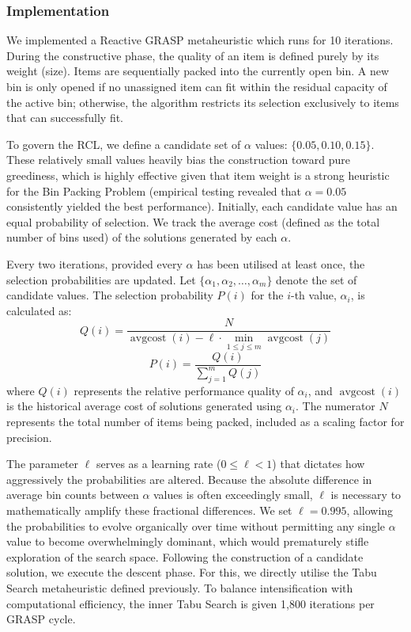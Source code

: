 \documentclass[11pt]{article}
\begin{document}
\subsubsection{Implementation}
We implemented a Reactive GRASP metaheuristic which runs for 10 iterations. 
During the constructive phase, the quality of an item is defined purely by 
its weight (size). Items are sequentially packed into the currently open bin. 
A new bin is only opened if no unassigned item can fit within the residual 
capacity of the active bin; otherwise, the algorithm restricts its selection 
exclusively to items that can successfully fit.

To govern the RCL, we define a candidate set of $\alpha$ values: 
$\{0.05, 0.10, 0.15\}$. These relatively small values heavily bias the 
construction toward pure greediness, which is highly effective given that 
item weight is a strong heuristic for the Bin Packing Problem (empirical 
testing revealed that $\alpha = 0.05$ consistently yielded the best 
performance). Initially, each candidate value has an equal probability of 
selection. We track the average cost (defined as the total number of bins 
used) of the solutions generated by each $\alpha$.

Every two iterations, provided every $\alpha$ has been utilised at least 
once, the selection probabilities are updated. Let $\{\alpha_1, \alpha_2, 
\dots, \alpha_m\}$ denote the set of candidate values. The selection 
probability $P(i)$ for the $i$-th value, $\alpha_i$, is calculated as:
$$Q(i) = \frac{N}{\operatorname{avgcost}(i) - \ell \cdot \min_{1 \le j \le m} \operatorname{avgcost}(j)}$$
$$P(i) = \frac{Q(i)}{\sum_{j=1}^{m} Q(j)}$$
where $Q(i)$ represents the relative performance quality of $\alpha_i$, and 
$\operatorname{avgcost}(i)$ is the historical average cost of solutions 
generated using $\alpha_i$. The numerator $N$ represents the total number of 
items being packed, included as a scaling factor for precision.

The parameter $\ell$ serves as a learning rate ($0 \le \ell < 1$) that 
dictates how aggressively the probabilities are altered. Because the absolute 
difference in average bin counts between $\alpha$ values is often exceedingly 
small, $\ell$ is necessary to mathematically amplify these fractional 
differences. We set $\ell = 0.995$, allowing the probabilities to evolve 
organically over time without permitting any single $\alpha$ value to become 
overwhelmingly dominant, which would prematurely stifle exploration of the 
search space. Following the construction of a candidate solution, we execute 
the descent phase. For this, we directly utilise the Tabu Search metaheuristic 
defined previously. To balance intensification with computational efficiency, 
the inner Tabu Search is given 1{,}800 iterations per GRASP cycle.
\end{document}
